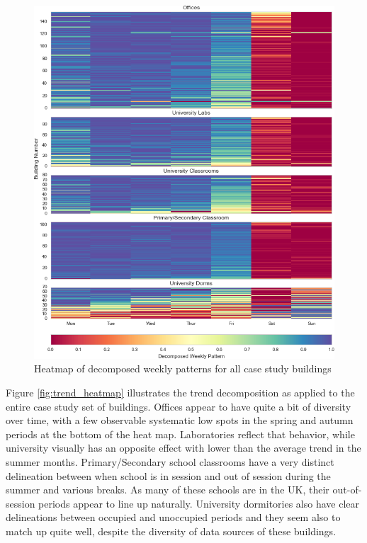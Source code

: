 \begin{figure}[ht!]
\begin{center}
\includegraphics[width=1\columnwidth]{figures/stl_weathernorm_weeklypattern_heatmap/stl_weathernorm_weeklypattern_heatmap}
\caption{Heatmap of decomposed weekly patterns for all case study buildings
\label{fig:weeklypattern_heatmap}%
}
\end{center}
\end{figure}


Figure \ref{fig:trend_heatmap} illustrates the trend decomposition as applied to the entire case study set of buildings. Offices appear to have quite a bit of diversity over time, with a few observable systematic low spots in the spring and autumn periods at the bottom of the heat map. Laboratories reflect that behavior, while university visually has an opposite effect with lower than the average trend in the summer months. Primary/Secondary school classrooms have a very distinct delineation between when school is in session and out of session during the summer and various breaks. As many of these schools are in the UK, their out-of-session periods appear to line up naturally. University dormitories also have clear delineations between occupied and unoccupied periods and they seem also to match up quite well, despite the diversity of data sources of these buildings.

